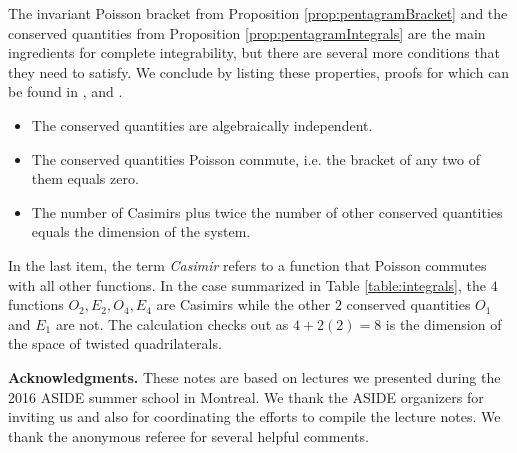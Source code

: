 \documentclass{amsart}
\theoremstyle{definition}
\theoremstyle{remark}
\numberwithin{equation}{section}
\begin{document}
	The invariant Poisson bracket from Proposition \ref{prop:pentagramBracket} and the conserved quantities from Proposition \ref{prop:pentagramIntegrals} are the main ingredients for complete integrability, but there are several more conditions that they need to satisfy.  We conclude by listing these properties, proofs for which can be found in \cite{OST10}, \cite{GSTV12} and \cite{GK13}.
	\begin{itemize}
	\item The conserved quantities are algebraically independent.
	\item The conserved quantities Poisson commute, i.e. the bracket of any two of them equals zero.
	\item The number of Casimirs plus twice the number of other conserved quantities equals the dimension of the system.
	\end{itemize}
	In the last item, the term \emph{Casimir} refers to a function that Poisson commutes with all other functions.  In the case summarized in Table \ref{table:integrals}, the $4$ functions $O_2,E_2,O_4,E_4$ are Casimirs while the other $2$ conserved quantities $O_1$ and $E_1$ are not.  The calculation checks out as $4+2(2)=8$ is the dimension of the space of twisted quadrilaterals.
	
	\medskip
	\textbf{Acknowledgments.} These notes are based on lectures we presented during the 2016 ASIDE summer school in Montreal.  We thank the ASIDE organizers for inviting us and also for coordinating the efforts to compile the lecture notes.  We thank the anonymous referee for several helpful comments.
	
\end{document}
